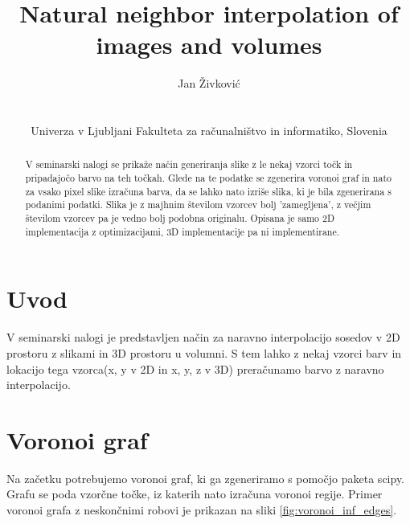 \documentclass{egpubl}
\title[Natural neighbor interpolation of images and volumes]%
{Natural neighbor interpolation of images and volumes}
\author[Jan Živković]
{\parbox{\textwidth}{\centering Jan Živković}
	\\
	{\parbox{\textwidth}{\centering Univerza v Ljubljani Fakulteta za računalništvo in informatiko, Slovenia}
	}
}
\begin{document}
	
	
	\maketitle
	\begin{abstract}
		V seminarski nalogi se prikaže način generiranja slike z le nekaj vzorci točk in pripadajočo barvo na teh točkah. Glede na te podatke se zgenerira voronoi graf in nato za vsako pixel slike izračuna barva, da se lahko nato izriše slika, ki je bila zgenerirana s podanimi podatki. Slika je z majhnim številom vzorcev bolj 'zamegljena', z večjim številom vzorcev pa je vedno bolj podobna originalu. Opisana je samo 2D implementacija z optimizacijami, 3D implementacije pa ni implementirane.
		  
	\end{abstract}  
	\section{Uvod}
	
	V seminarski nalogi je predstavljen način za naravno interpolacijo sosedov v 2D prostoru z slikami in 3D prostoru u volumni. S tem lahko z nekaj vzorci barv in lokacijo tega vzorca(x, y v 2D in x, y, z v 3D) preračunamo barvo z naravno interpolacijo.
	
	\section{Voronoi graf}\label{voronoi}
	Na začetku potrebujemo voronoi graf, ki ga zgeneriramo s pomočjo paketa scipy. Grafu se poda vzorčne točke, iz katerih nato izračuna voronoi regije. Primer voronoi grafa z neskončnimi robovi je prikazan na sliki \ref{fig:voronoi_inf_edges}.
	
\end{document}
